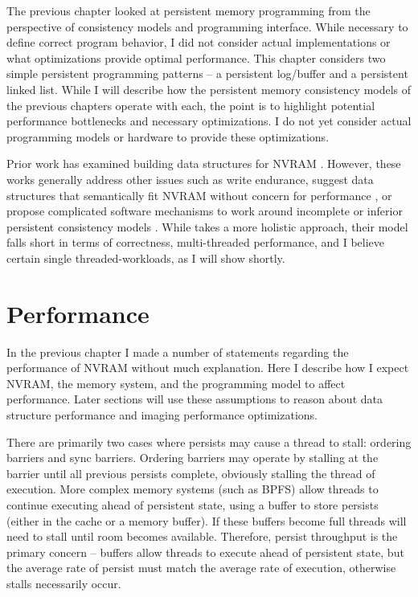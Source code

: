 The previous chapter looked at persistent memory programming from the perspective of consistency models and programming interface.
While necessary to define correct program behavior, I did not consider actual implementations or what optimizations provide optimal performance.
This chapter considers two simple persistent programming patterns -- a persistent log/buffer and a persistent linked list.
While I will describe how the persistent memory consistency models of the previous chapters operate with each, the point is to highlight potential performance bottlenecks and necessary optimizations.
I do not yet consider actual programming models or hardware to provide these optimizations.

Prior work has examined building data structures for NVRAM .
However, these works generally address other issues such as write endurance, suggest data structures that semantically fit NVRAM without concern for performance , or propose complicated software mechanisms to work around incomplete or inferior persistent consistency models .
While  takes a more holistic approach, their model falls short in terms of correctness, multi-threaded performance, and I believe certain single threaded-workloads, as I will show shortly.

\section{Performance}
\label{sec:PMC_patterns:Performance}

In the previous chapter I made a number of statements regarding the performance of NVRAM without much explanation.
Here I describe how I expect NVRAM, the memory system, and the programming model to affect performance.
Later sections will use these assumptions to reason about data structure performance and imaging performance optimizations.

There are primarily two cases where persists may cause a thread to stall: ordering barriers and sync barriers.
Ordering barriers may operate by stalling at the barrier until all previous persists complete, obviously stalling the thread of execution.
More complex memory systems (such as BPFS) allow threads to continue executing ahead of persistent state, using a buffer to store persists (either in the cache or a memory buffer).
If these buffers become full threads will need to stall until room becomes available.
Therefore, persist throughput is the primary concern -- buffers allow threads to execute ahead of persistent state, but the average rate of persist must match the average rate of execution, otherwise stalls necessarily occur.

